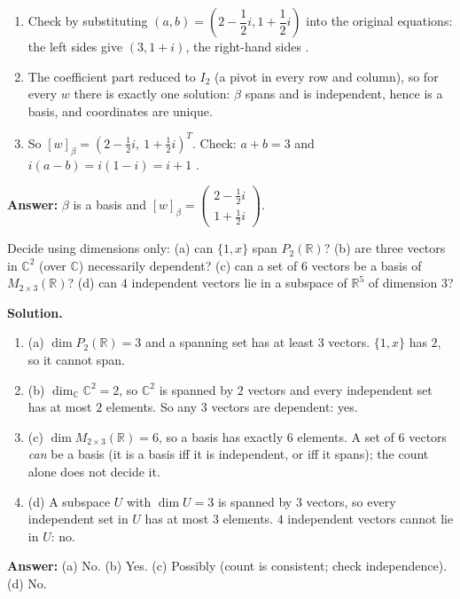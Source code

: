 \documentclass[11pt]{article}
\begin{document}
\begin{tcolorbox}[breakable,colback=white,colframe=ink!60,title={\bfseries Example 6 \textperiodcentered\ Coordinates in $\mathbb{C}^{2}$}]
\begin{enumerate}[leftmargin=1.6em,itemsep=1pt,topsep=2pt,label=\arabic*.]
\item Check by substituting $(a,b)=(2-\dfrac{1}{2}i,1+\dfrac{1}{2}i)$ into the original equations: the left sides give $(3,1+i)$, the right-hand sides \checkmark.
\item The coefficient part reduced to $I_2$ (a pivot in every row and column), so for every $w$ there is exactly one solution: $\beta$ spans and is independent, hence is a basis, and coordinates are unique.
\item So $[w]_\beta=(2-\tfrac12 i,\ 1+\tfrac12 i)^{T}$. Check: $a+b=3$ \checkmark and $i(a-b)=i(1-i)=i+1$ \checkmark.
\end{enumerate}\textbf{Answer:} $\beta$ is a basis and $[w]_\beta=\begin{pmatrix}2-\frac12 i\\ 1+\frac12 i\end{pmatrix}$.
\end{tcolorbox}
\begin{tcolorbox}[breakable,colback=white,colframe=ink!60,title={\bfseries Example 7 \textperiodcentered\ Counting arguments}]Decide using dimensions only: (a) can $\{1,x\}$ span $P_2(\mathbb{R})$? (b) are three vectors in $\mathbb{C}^{2}$ (over $\mathbb{C}$) necessarily dependent? (c) can a set of $6$ vectors be a basis of $M_{2\times3}(\mathbb{R})$? (d) can $4$ independent vectors lie in a subspace of $\mathbb{R}^{5}$ of dimension $3$?
\par\smallskip
\textbf{Solution.} \begin{enumerate}[leftmargin=1.6em,itemsep=1pt,topsep=2pt,label=\arabic*.]\item (a) $\dim P_2(\mathbb{R})=3$ and a spanning set has at least $3$ vectors. $\{1,x\}$ has $2$, so it cannot span.
\item (b) $\dim_{\mathbb{C}}\mathbb{C}^{2}=2$, so $\mathbb{C}^{2}$ is spanned by $2$ vectors and every independent set has at most $2$ elements. So any $3$ vectors are dependent: yes.
\item (c) $\dim M_{2\times3}(\mathbb{R})=6$, so a basis has exactly $6$ elements. A set of $6$ vectors \emph{can} be a basis (it is a basis iff it is independent, or iff it spans); the count alone does not decide it.
\item (d) A subspace $U$ with $\dim U=3$ is spanned by $3$ vectors, so every independent set in $U$ has at most $3$ elements. $4$ independent vectors cannot lie in $U$: no.
\end{enumerate}\textbf{Answer:} (a) No. (b) Yes. (c) Possibly (count is consistent; check independence). (d) No.
\end{tcolorbox}
\end{document}
